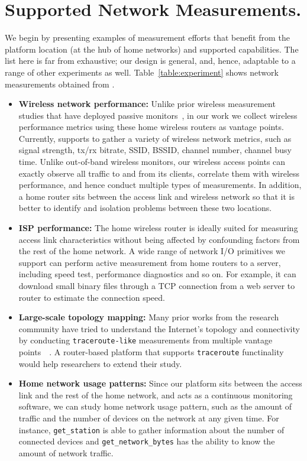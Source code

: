 {\section{Supported Network Measurements.}
\label{sec.network_measurement}
We begin by presenting examples of measurement efforts that benefit from the platform location (at the hub of home networks) and supported capabilities. The list here is far from exhaustive; our design is general, and, hence, adaptable to a range of other experiments as well. Table~\ref{table:experiment} shows network measurements obtained from \sysname.

\begin{itemize}
\item \textbf{Wireless network performance:} Unlike prior wireless measurement studies that have deployed passive monitors~\cite{mahajan2006analyzing,raghavendra2009wi,papagiannaki2006experimental}, in our work we collect wireless performance metrics using these home wireless routers as vantage points. Currently, \sysname supports to gather a variety of wireless network metrics, such as signal strength, tx/rx bitrate, SSID, BSSID, channel number, channel busy time.  Unlike out-of-band wireless monitors, our wireless access points can exactly observe all traffic to and from its clients, correlate them with wireless performance, and hence conduct multiple types of measurements. In addition, a home router sits between the access link and wireless network so that it is better to identify and isolation problems between these two locations.

\item \textbf{ISP performance:} The home wireless router is ideally suited for measuring access link characteristics without being affected by confounding factors from the rest of the home network. A wide range of network I/O primitives we support can perform active measurement from home routers to a server, including speed test, performance diagnostics and so on. For example, it can download small binary files through a TCP connection from a web server to router to estimate the connection speed.

\item \textbf{Large-scale topology mapping:} Many prior works from the research community have tried to understand the Internet's topology and connectivity by conducting \texttt{traceroute-like} measurements from multiple vantage points~\cite{paxson1996end}~\cite{chen2009sidewalk}. A router-based platform that supports \texttt{traceroute} functinality would help researchers to extend their study.

\item \textbf{Home network usage patterns:} Since our platform sits between the access link and the rest of the home network, and acts as a continuous monitoring software, we can study home network usage pattern, such as the amount of traffic and the number of devices on the network at any given time. For instance, \texttt{get\_station} is able to gather information about the number of connected devices and \texttt{get\_network\_bytes} has the ability to know the amount of network traffic.    
\end{itemize} 
\par}
